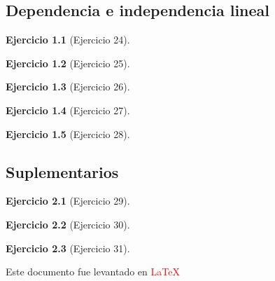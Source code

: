 \documentclass[a4paper,11pt, openany]{book}
\newtheorem{ejer}{Ejercicio}[section]
\begin{document}
\textcolor{awesome}{\chapter{Dependencia e independencia lineal}}  
 
\begin{ejer}[Ejercicio 24]
 
\end{ejer}
 
\begin{ejer}[Ejercicio 25]
 
\end{ejer}
 
\begin{ejer}[Ejercicio 26]
 
\end{ejer}
 
\begin{ejer}[Ejercicio 27]
 
\end{ejer}
 
\begin{ejer}[Ejercicio 28]
 
\end{ejer}
 
 
\textcolor{brass}{\chapter{Suplementarios}}
 
\begin{ejer}[Ejercicio 29]
 
\end{ejer}
 
\begin{ejer}[Ejercicio 30]
 
\end{ejer}
 
\begin{ejer}[Ejercicio 31]
 
\end{ejer}
 
Este documento fue levantado en \textcolor{red}{\LaTeX}
 
\end{document}
